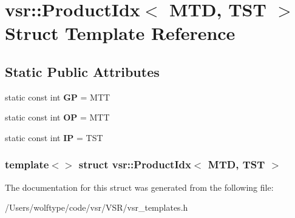 \hypertarget{structvsr_1_1_product_idx_3_01_m_t_d_00_01_t_s_t_01_4}{\section{vsr\-:\-:Product\-Idx$<$ M\-T\-D, T\-S\-T $>$ Struct Template Reference}
\label{structvsr_1_1_product_idx_3_01_m_t_d_00_01_t_s_t_01_4}
}
\subsection*{Static Public Attributes}
\begin{DoxyCompactItemize}
\item 
\hypertarget{structvsr_1_1_product_idx_3_01_m_t_d_00_01_t_s_t_01_4_a03fd0de46c0848eafd715a92ba85db04}{static const int {\bfseries G\-P} = M\-T\-T}\label{structvsr_1_1_product_idx_3_01_m_t_d_00_01_t_s_t_01_4_a03fd0de46c0848eafd715a92ba85db04}

\item 
\hypertarget{structvsr_1_1_product_idx_3_01_m_t_d_00_01_t_s_t_01_4_a86688d072ddfbb8b91e446167de516ba}{static const int {\bfseries O\-P} = M\-T\-T}\label{structvsr_1_1_product_idx_3_01_m_t_d_00_01_t_s_t_01_4_a86688d072ddfbb8b91e446167de516ba}

\item 
\hypertarget{structvsr_1_1_product_idx_3_01_m_t_d_00_01_t_s_t_01_4_a5bbc83d9ff99117e16dff6dadb862104}{static const int {\bfseries I\-P} = T\-S\-T}\label{structvsr_1_1_product_idx_3_01_m_t_d_00_01_t_s_t_01_4_a5bbc83d9ff99117e16dff6dadb862104}

\end{DoxyCompactItemize}
\subsubsection*{template$<$$>$ struct vsr\-::\-Product\-Idx$<$ M\-T\-D, T\-S\-T $>$}



The documentation for this struct was generated from the following file\-:\begin{DoxyCompactItemize}
\item 
/\-Users/wolftype/code/vsr/\-V\-S\-R/vsr\-\_\-templates.\-h\end{DoxyCompactItemize}
